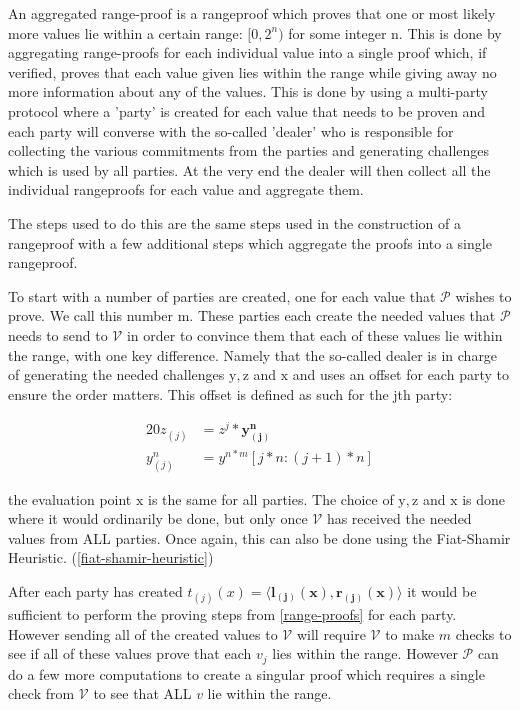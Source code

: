\documentclass{article}
\newcommand{\eq}[1]{\begin{alignat*}{20}#1\end{alignat*}}
\renewcommand{\vec}[1]{\boldsymbol{#1}}
\newcommand{\ran}[1]{\mathrm{#1}}
\newcommand{\V}{\mathcal{V}}
\renewcommand{\P}{\mathcal{P}}
\newcommand{\dotp}[2]{\langle #1, #2 \rangle}
\begin{document}
An aggregated range-proof is a rangeproof which proves that one or most likely more values lie within a certain range: $[0,2^n)$ for some integer n. This is done by aggregating range-proofs for each individual value into a single proof which, if verified, proves that each value given lies within the range while giving away no more information about any of the values. This is done by using a multi-party protocol where a 'party' is created for each value that needs to be proven and each party will converse with the so-called 'dealer' who is responsible for collecting the various commitments from the parties and generating challenges which is used by all parties. At the very end the dealer will then collect all the individual rangeproofs for each value and aggregate them. 

The steps used to do this are the same steps used in the construction of a rangeproof with a few additional steps which aggregate the proofs into a single rangeproof. 

To start with a number of parties are created, one for each value that $\P$ wishes to prove. We call this number m. These parties each create the needed values that $\P$ needs to send to $\V$ in order to convince them that each of these values lie within the range, with one key difference. Namely that the so-called dealer is in charge of generating the needed challenges $\ran{y}, \ran{z}$ and $\ran{x}$ and uses an offset for each party to ensure the order matters. This offset is defined as such for the jth party:

\eq{
	z_{(j)} &= z^j * \vec{y^n_{(j)}}\\
	y^n_{(j)} &= y^{n*m}[j*n:(j+1)*n]
}

the evaluation point $\ran{x}$ is the same for all parties. The choice of $\ran{y}, \ran{z}$ and $\ran{x}$ is done where it would ordinarily be done, but only once $\V$ has received the needed values from ALL parties. Once again, this can also be done using the Fiat-Shamir Heuristic. (\ref{fiat-shamir-heuristic}) 

After each party has created $t_{(j)}(x) = \dotp{\vec{l_{(j)}(x)}}{\vec{r_{(j)}(x)}}$ it would be sufficient to perform the proving steps from \ref{range-proofs} for each party. However sending all of the created values to $\V$ will require $\V$ to make $m$ checks to see if all of these values prove that each $v_j$ lies within the range. However $\P$ can do a few more computations to create a singular proof which requires a single check from $\V$ to see that ALL $v$ lie within the range.
\end{document}
